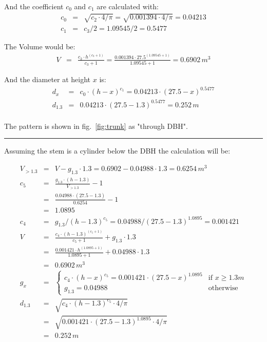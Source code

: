 \documentclass[twocolumn,10pt]{article}
\begin{document}
And the coefficient $c_0$ and $c_1$ are calculated with:
\begin{eqnarray*}
c_0 & = & \sqrt{c_2\cdot 4 / \pi} = \sqrt{0.001394 \cdot 4 / \pi} = 0.04213\\
c_1 & = & c_3/2 = 1.09545/2 = 0.5477
\end{eqnarray*}

The Volume would be:
\begin{eqnarray*}
V & = & \frac{c_2 \cdot h^{(c_3 + 1)}}{c_3 + 1} =
  \frac{0.001394 \cdot 27.5^{(1.09545 + 1)}}{1.09545 + 1} = 0.6902\,m^3
\end{eqnarray*}

And the diameter at height $x$ is:
\begin{eqnarray*}
d_x & = & c_0 \cdot (h - x)^{c_1} = 0.04213 \cdot (27.5 - x)^{0.5477}\\
d_{1.3} & = & 0.04213 \cdot (27.5 - 1.3)^{0.5477} = 0.252\,m\\
\end{eqnarray*}

The pattern is shown in fig.~\ref{fig:trunk} as "through DBH".

\par\noindent\rule{\columnwidth}{0.5pt}

Assuming the stem is a cylinder below the DBH the calculation will be:

\begin{eqnarray*}
V_{>1.3} & = & V - g_{1.3} \cdot 1.3 = 0.6902 - 0.04988 \cdot 1.3 = 0.6254\,m^3\\
c_5 & = & \frac{g_{1.3} \cdot (h - 1.3)}{V_{>1.3}} - 1\\
  & = & \frac{0.04988 \cdot (27.5 - 1.3)}{0.6254} - 1\\
  & = & 1.0895\\
c_4 & = & g_{1.3} / (h-1.3)^{c_5} = 0.04988 / (27.5-1.3)^{1.0895} = 0.001421\\
V & = & \frac{c_4 \cdot (h-1.3)^{(c_5 + 1)}}{c_5 + 1} + g_{1.3} \cdot 1.3\\
 & = & \frac{0.001421 \cdot h^{(1.0895 + 1)}}{1.0895 + 1} + 0.04988 \cdot 1.3\\
 & = & 0.6902\,m^3\\
g_x & = & \begin{cases}
    c_4 \cdot (h - x)^{c_5} = 0.001421 \cdot (27.5 - x)^{1.0895} & \text{if } x\geq 1.3m\\
    g_{1.3} = 0.04988              & \text{otherwise}
    \end{cases}\\
d_{1.3} & = & \sqrt{c_4 \cdot (h - 1.3)^{c_5} \cdot 4/\pi}\\
 & = & \sqrt{0.001421 \cdot (27.5 - 1.3)^{1.0895} \cdot 4/\pi}\\
 & = & 0.252\,m
\end{eqnarray*}
\end{document}
